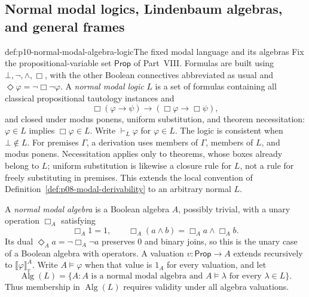 
\subsection{Normal modal logics, Lindenbaum algebras, and general frames}
\label{sec:p10-modal-algebra-completeness}

\begin{hbdefinition}{def:p10-normal-modal-algebra-logic}{The fixed modal language and its algebras}
Fix the propositional-variable set \(\mathsf{Prop}\) of Part~VIII.
Formulas are built using \(\bot,\neg,\wedge,\Box\), with the other
Boolean connectives abbreviated as usual and
\(\Diamond\varphi=\neg\Box\neg\varphi\).
A \emph{normal modal logic} \(L\) is a set of formulas containing
all classical propositional tautology instances and
\[
 \Box(\varphi\to\psi)\to(\Box\varphi\to\Box\psi),
\]
and closed under modus ponens, uniform substitution, and
theorem necessitation: \(\varphi\in L\) implies \(\Box\varphi\in L\).
Write \(\vdash_L\varphi\) for \(\varphi\in L\).
The logic is consistent when \(\bot\notin L\).
For premises \(\Gamma\), a derivation uses members of \(\Gamma\),
members of \(L\), and modus ponens.  Necessitation applies only
to theorems, whose boxes already belong to \(L\); uniform
substitution is likewise a closure rule for \(L\), not a rule
for freely substituting in premises.
This extends the local convention of
Definition~\ref{def:p08-modal-derivability} to an arbitrary normal \(L\).

A \emph{normal modal algebra} is a Boolean algebra \(A\), possibly
trivial, with a unary operation \(\Box_A\) satisfying
\[
 \Box_A1=1,\qquad
 \Box_A(a\wedge b)=\Box_Aa\wedge\Box_Ab.
\]
Its dual \(\Diamond_Aa=\neg\Box_A\neg a\) preserves \(0\) and
binary joins, so this is the unary case of a Boolean algebra
with operators.
A valuation \(v:\mathsf{Prop}\to A\) extends recursively to
\(\llbracket\varphi\rrbracket_v^A\).
Write \(A\models\varphi\) when that value is \(1_A\) for every
valuation, and let
\[
 \operatorname{Alg}(L)
   =\{A:A\text{ is a normal modal algebra and }
                   A\models\lambda\text{ for every }\lambda\in L\}.
\]
Thus membership in \(\operatorname{Alg}(L)\) requires validity
under all algebra valuations.
\end{hbdefinition}

